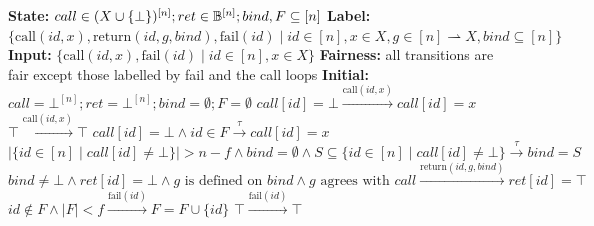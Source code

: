 \begin{transys}
    \label{PLTS:Gather}
    \caption{Encoding of \textsf{Gather}}
    \begin{algorithmic}
        \State \textbf{State:} $call \in (X\cup\{\bot\})^{[n]}; ret \in \mathbb{B}^{[n]};
        bind, F \subseteq [n]$
        \State \textbf{Label:} $\{\text{call}(id,x), \text{return}(id,g,bind), \text{fail}(id) \mid
        id \in [n], x \in X, g \in [n] \rightharpoonup X, bind \subseteq [n]\}$
        \State \textbf{Input:} $\{\text{call}(id,x), \text{fail}(id) \mid id \in [n], x \in X\}$
        \State \textbf{Fairness:} all transitions are fair except those labelled by fail and the
        call loops
        \State \textbf{Initial:} $call = \bot^{[n]}; ret = \bot^{[n]}; bind = \emptyset;
        F = \emptyset$
        \medskip
        \State
        $call[id] = \bot
        \xrightarrow{\text{call}(id,x)}
        call[id] = x$
        \State
        $\top
        \xrightarrow{\text{call}(id,x)}
        \top$ 
        \State
        $call[id] = \bot \wedge id \in F
        \xrightarrow{\tau}
        call[id] = x$
        \State
        $|\{id \in [n] \mid call[id] \ne \bot\}| > n-f
        \wedge bind = \emptyset
        \wedge S \subseteq \{id \in [n] \mid call[id] \ne \bot\}
        \xrightarrow{\tau}
        bind = S$
        \State
        $bind \ne \bot
        \wedge ret[id] = \bot
        \wedge g \text{ is defined on } bind
        \wedge g \text{ agrees with } call
        \xrightarrow{\text{return}(id,g,bind)}
        ret[id] = \top$
        \State
        $id \not\in F \wedge |F| < f
        \xrightarrow{\text{fail}(id)}
        F = F \cup \{id\}$
        \State
        $\top
        \xrightarrow{\text{fail}(id)}
        \top$ 
    \end{algorithmic}
\end{transys}

